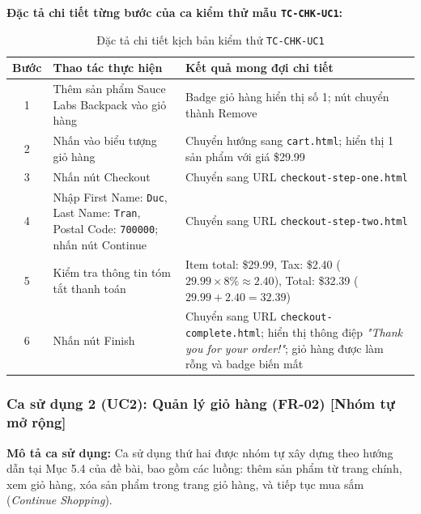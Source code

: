 \documentclass[a4paper]{article}
\begin{document}
\noindent \textbf{Đặc tả chi tiết từng bước của ca kiểm thử mẫu \texttt{TC-CHK-UC1}:}
\begin{table}[H]
\centering
\small
\begin{tabularx}{\textwidth}{|c|p{5.5cm}|X|}
\hline
\textbf{Bước} & \textbf{Thao tác thực hiện} & \textbf{Kết quả mong đợi chi tiết} \\ \hline
1 & Thêm sản phẩm Sauce Labs Backpack vào giỏ hàng & Badge giỏ hàng hiển thị số 1; nút chuyển thành Remove \\ \hline
2 & Nhấn vào biểu tượng giỏ hàng & Chuyển hướng sang \texttt{cart.html}; hiển thị 1 sản phẩm với giá \$29.99 \\ \hline
3 & Nhấn nút Checkout & Chuyển sang URL \texttt{checkout-step-one.html} \\ \hline
4 & Nhập First Name: \texttt{Duc}, Last Name: \texttt{Tran}, Postal Code: \texttt{700000}; nhấn nút Continue & Chuyển sang URL \texttt{checkout-step-two.html} \\ \hline
5 & Kiểm tra thông tin tóm tắt thanh toán & Item total: \$29.99, Tax: \$2.40 ($29.99 \times 8\% \approx 2.40$), Total: \$32.39 ($29.99 + 2.40 = 32.39$) \\ \hline
6 & Nhấn nút Finish & Chuyển sang URL \texttt{checkout-complete.html}; hiển thị thông điệp \textit{"Thank you for your order!"}; giỏ hàng được làm rỗng và badge biến mất \\ \hline
\end{tabularx}
\caption{Đặc tả chi tiết kịch bản kiểm thử \texttt{TC-CHK-UC1}}
\end{table}

\clearpage
\subsubsection{Ca sử dụng 2 (UC2): Quản lý giỏ hàng (FR-02) [Nhóm tự mở rộng]}
\noindent \textbf{Mô tả ca sử dụng:} Ca sử dụng thứ hai được nhóm tự xây dựng theo hướng dẫn tại Mục 5.4 của đề bài, bao gồm các luồng: thêm sản phẩm từ trang chính, xem giỏ hàng, xóa sản phẩm trong trang giỏ hàng, và tiếp tục mua sắm (\textit{Continue Shopping}).
\end{document}
